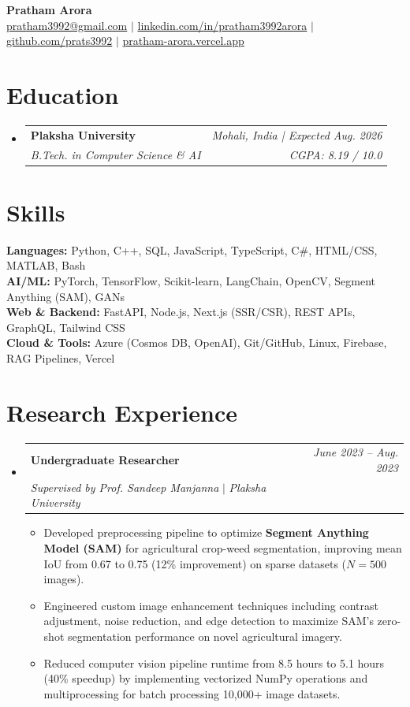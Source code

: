 \documentclass[letterpaper,11pt]{article}
\makeatletter
\newcommand{\resumeSubHeadingListStart}{\begin{itemize}[leftmargin=0.15in, label={}]}
\newcommand{\resumeSubHeadingListEnd}{\end{itemize}}
\newcommand{\resumeItemListStart}{\begin{itemize}[leftmargin=0.2in]}
\newcommand{\resumeItemListEnd}{\end{itemize}\vspace{1pt}}
\newcommand{\resumeItem}[1]{
  \item\small{#1 \vspace{-2pt}}
}
\newcommand{\resumeSubheading}[4]{
  \vspace{-2pt}\item
    \begin{tabular*}{0.97\textwidth}[t]{l@{\extracolsep{\fill}}r}
      \textbf{#1} & \textit{\small #2} \\
      \textit{\small#3} & \textit{\small #4} \\[2pt] 
    \end{tabular*}
}
\newcommand{\resumeExperienceHeading}[4]{
  \vspace{-2pt}\item
    \begin{tabular*}{0.97\textwidth}[t]{l@{\extracolsep{\fill}}r}
      \textbf{\large #1} & \textit{\small #4} \\
      \textit{\small #2} $|$ \textit{\small #3} & \\[3pt] 
    \end{tabular*}
}
\makeatother
\begin{document}
\begin{center}
    \textbf{\Huge Pratham Arora} \\ \vspace{10pt}
    \small 
    \href{mailto:pratham3992@gmail.com}{pratham3992@gmail.com} $|$
    \href{https://www.linkedin.com/in/pratham3992arora}{linkedin.com/in/pratham3992arora} $|$
    \href{https://github.com/prats3992}{github.com/prats3992} $|$
    \href{https://pratham-arora.vercel.app/}{pratham-arora.vercel.app}
\end{center}

\section{Education}
  \resumeSubHeadingListStart
    \resumeSubheading
      {Plaksha University}{Mohali, India | Expected Aug. 2026}
      {B.Tech. in Computer Science \& AI}{CGPA: 8.19 / 10.0}
  \resumeSubHeadingListEnd

\section{Skills}
\begin{itemize}[leftmargin=0.15in, label={}]
    \small{\item{
        \textbf{Languages:} \quad Python, C++, SQL, JavaScript, TypeScript, C\#, HTML/CSS, MATLAB, Bash \\
        \textbf{AI/ML:} \quad PyTorch, TensorFlow, Scikit-learn, LangChain, OpenCV, Segment Anything (SAM), GANs \\
        \textbf{Web \& Backend:} \quad FastAPI, Node.js, Next.js (SSR/CSR), REST APIs, GraphQL, Tailwind CSS \\
        \textbf{Cloud \& Tools:} \quad Azure (Cosmos DB, OpenAI), Git/GitHub, Linux, Firebase, RAG Pipelines, Vercel
    }}
\end{itemize}

\section{Research Experience}
\resumeSubHeadingListStart
    \resumeExperienceHeading
      {Undergraduate Researcher}{Supervised by Prof. Sandeep Manjanna}{Plaksha University}{June 2023 -- Aug. 2023}
      \resumeItemListStart
        \resumeItem{Developed preprocessing pipeline to optimize \textbf{Segment Anything Model (SAM)} for agricultural crop-weed segmentation, improving mean IoU from 0.67 to 0.75 (12\% improvement) on sparse datasets ($N=500$ images).}
        \resumeItem{Engineered custom image enhancement techniques including contrast adjustment, noise reduction, and edge detection to maximize SAM's zero-shot segmentation performance on novel agricultural imagery.}
        \resumeItem{Reduced computer vision pipeline runtime from 8.5 hours to 5.1 hours (40\% speedup) by implementing vectorized NumPy operations and multiprocessing for batch processing 10,000+ image datasets.}
      \resumeItemListEnd
\resumeSubHeadingListEnd
\end{document}
